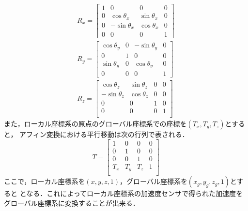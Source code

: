 \documentclass[11pt,a4]{jsarticle}
\begin{document}
     \begin{eqnarray}
       R_x =
         \left[ \begin{array}{cccc}
           1 &        0       &       0       & 0 \\
           0 &  \cos \theta_x & \sin \theta_x & 0 \\
           0 & -\sin \theta_x & \cos \theta_x & 0 \\
           0 &        0       &       0       & 1
         \end{array} \right] \\
       R_y =
         \left[ \begin{array}{cccc}
           \cos \theta_y & 0 & -\sin \theta_y & 0 \\
                 0       & 1 &       0        & 0 \\
           \sin \theta_y & 0 &  \cos \theta_y & 0 \\
                 0       & 0 &       0        & 1
         \end{array} \right] \\
       R_z =
         \left[ \begin{array}{cccc}
           \cos \theta_z & \sin \theta_z & 0 & 0 \\
          -\sin \theta_z & \cos \theta_z & 0 & 0 \\
                 0       &       0       & 1 & 0 \\
                 0       &       0       & 0 & 1 \\
         \end{array} \right]
     \end{eqnarray}
     また，ローカル座標系の原点のグローバル座標系での座標を$(T_x, T_y, T_z)$とすると，
     アフィン変換における平行移動は次の行列で表される．
     \begin{equation}
      T =
        \left[ \begin{array}{cccc}
           1  &  0  &  0  & 0 \\
           0  &  1  &  0  & 0 \\
           0  &  0  &  1  & 0 \\
          T_x & T_y & T_z & 1 \\
        \end{array} \right]
     \end{equation}
     ここで，ローカル座標系を$(x, y, z, 1)$，グローバル座標系を$(x_g, y_g, z_g, 1)$とすると
     となる．これによってローカル座標系の加速度センサで得られた加速度をグローバル座標系に変換することが出来る．
\end{document}
